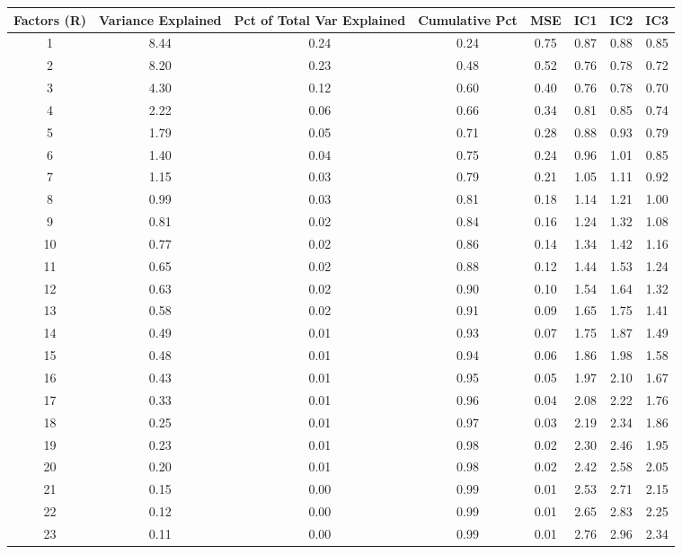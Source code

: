 \documentclass[11pt, letterpaper]{article}\usepackage[]{graphicx}\usepackage[]{color}
\begin{document}
\begin{table}[H]
\centering
\begingroup\scriptsize
\begin{tabular}{cccccccc}
  \hline
Factors (R) & Variance Explained & Pct of Total Var Explained & Cumulative Pct & MSE & IC1 & IC2 & IC3 \\ 
  \hline
  1 & 8.44 & 0.24 & 0.24 & 0.75 & 0.87 & 0.88 & 0.85 \\ 
    2 & 8.20 & 0.23 & 0.48 & 0.52 & 0.76 & 0.78 & 0.72 \\ 
    3 & 4.30 & 0.12 & 0.60 & 0.40 & 0.76 & 0.78 & 0.70 \\ 
    4 & 2.22 & 0.06 & 0.66 & 0.34 & 0.81 & 0.85 & 0.74 \\ 
    5 & 1.79 & 0.05 & 0.71 & 0.28 & 0.88 & 0.93 & 0.79 \\ 
    6 & 1.40 & 0.04 & 0.75 & 0.24 & 0.96 & 1.01 & 0.85 \\ 
    7 & 1.15 & 0.03 & 0.79 & 0.21 & 1.05 & 1.11 & 0.92 \\ 
    8 & 0.99 & 0.03 & 0.81 & 0.18 & 1.14 & 1.21 & 1.00 \\ 
    9 & 0.81 & 0.02 & 0.84 & 0.16 & 1.24 & 1.32 & 1.08 \\ 
   10 & 0.77 & 0.02 & 0.86 & 0.14 & 1.34 & 1.42 & 1.16 \\ 
   11 & 0.65 & 0.02 & 0.88 & 0.12 & 1.44 & 1.53 & 1.24 \\ 
   12 & 0.63 & 0.02 & 0.90 & 0.10 & 1.54 & 1.64 & 1.32 \\ 
   13 & 0.58 & 0.02 & 0.91 & 0.09 & 1.65 & 1.75 & 1.41 \\ 
   14 & 0.49 & 0.01 & 0.93 & 0.07 & 1.75 & 1.87 & 1.49 \\ 
   15 & 0.48 & 0.01 & 0.94 & 0.06 & 1.86 & 1.98 & 1.58 \\ 
   16 & 0.43 & 0.01 & 0.95 & 0.05 & 1.97 & 2.10 & 1.67 \\ 
   17 & 0.33 & 0.01 & 0.96 & 0.04 & 2.08 & 2.22 & 1.76 \\ 
   18 & 0.25 & 0.01 & 0.97 & 0.03 & 2.19 & 2.34 & 1.86 \\ 
   19 & 0.23 & 0.01 & 0.98 & 0.02 & 2.30 & 2.46 & 1.95 \\ 
   20 & 0.20 & 0.01 & 0.98 & 0.02 & 2.42 & 2.58 & 2.05 \\ 
   21 & 0.15 & 0.00 & 0.99 & 0.01 & 2.53 & 2.71 & 2.15 \\ 
   22 & 0.12 & 0.00 & 0.99 & 0.01 & 2.65 & 2.83 & 2.25 \\ 
   23 & 0.11 & 0.00 & 0.99 & 0.01 & 2.76 & 2.96 & 2.34 \\ 

\end{tabular}
\end{table}
\end{document}
